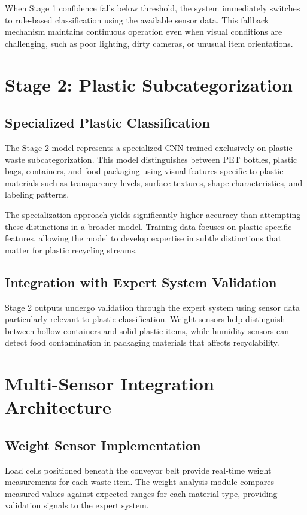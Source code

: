 \documentclass[11pt, a4paper]{article}
\begin{document}
When Stage 1 confidence falls below threshold, the system immediately switches to rule-based classification using the available sensor data. This fallback mechanism maintains continuous operation even when visual conditions are challenging, such as poor lighting, dirty cameras, or unusual item orientations.

\section{Stage 2: Plastic Subcategorization}

\subsection{Specialized Plastic Classification}
The Stage 2 model represents a specialized CNN trained exclusively on plastic waste subcategorization. This model distinguishes between PET bottles, plastic bags, containers, and food packaging using visual features specific to plastic materials such as transparency levels, surface textures, shape characteristics, and labeling patterns.

The specialization approach yields significantly higher accuracy than attempting these distinctions in a broader model. Training data focuses on plastic-specific features, allowing the model to develop expertise in subtle distinctions that matter for plastic recycling streams.

\subsection{Integration with Expert System Validation}
Stage 2 outputs undergo validation through the expert system using sensor data particularly relevant to plastic classification. Weight sensors help distinguish between hollow containers and solid plastic items, while humidity sensors can detect food contamination in packaging materials that affects recyclability.

\section{Multi-Sensor Integration Architecture}

\subsection{Weight Sensor Implementation}
Load cells positioned beneath the conveyor belt provide real-time weight measurements for each waste item. The weight analysis module compares measured values against expected ranges for each material type, providing validation signals to the expert system.
\end{document}
